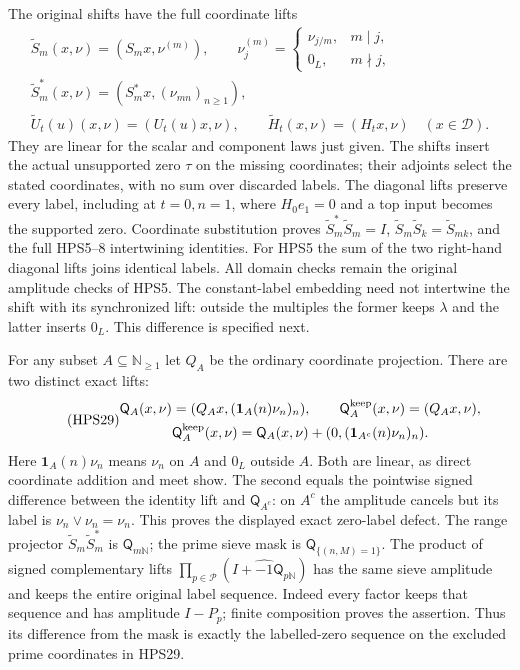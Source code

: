 The original shifts have the full coordinate lifts
\begin{equation}\tag{HPS28}
\begin{gathered}
 \widetilde S_m(x,\nu)=(S_mx,\nu^{(m)}),\qquad
 \nu^{(m)}_j=
    \begin{cases}\nu_{j/m},&m\mid j,\\0_L,&m\nmid j,\end{cases}\\
 \widetilde S_m^*(x,\nu)
                   =(S_m^*x,(\nu_{mn})_{n\ge1}),\\
 \widetilde U_t(u)(x,\nu)=(U_t(u)x,\nu),\qquad
 \widetilde H_t(x,\nu)=(H_tx,\nu)
                         \quad(x\in\mathcal D).
\end{gathered}
\end{equation}
They are linear for the scalar and component
laws just given. The shifts insert the actual
unsupported zero $\tau$ on the missing
coordinates; their adjoints select the stated
coordinates, with no sum over discarded labels.
The diagonal lifts preserve every label,
including at $t=0,n=1$, where $H_0e_1=0$
and a top input becomes the supported zero.
Coordinate substitution proves
$\widetilde S_m^*\widetilde S_m=I$,
$\widetilde S_m\widetilde S_k=\widetilde S_{mk}$,
and the full HPS5--8 intertwining identities.
For HPS5 the sum of the two right-hand
diagonal lifts joins identical labels.
All domain checks remain the original
amplitude checks of HPS5.
The constant-label embedding need not
intertwine the shift with its synchronized
lift: outside the multiples the former
keeps $\lambda$ and the latter inserts
$0_L$. This difference is specified next.

For any subset $A\subseteq\mathbb N_{\ge1}$
let $Q_A$ be the ordinary coordinate projection.
There are two distinct exact lifts:
\begin{equation}\tag{HPS29}
\begin{gathered}
 \mathsf Q_A(x,\nu)=(Q_Ax,(\mathbf1_A(n)\nu_n)_n),\qquad
 \mathsf Q_A^{\rm keep}(x,\nu)=(Q_Ax,\nu),\\
 \mathsf Q_A^{\rm keep}(x,\nu)
     =\mathsf Q_A(x,\nu)
                     +(0,(\mathbf1_{A^c}(n)\nu_n)_n).
\end{gathered}
\end{equation}
Here $\mathbf1_A(n)\nu_n$ means $\nu_n$
on $A$ and $0_L$ outside $A$.
Both are linear, as direct coordinate
addition and meet show. The second equals
the pointwise signed difference between
the identity lift and $\mathsf Q_{A^c}$:
on $A^c$ the amplitude cancels but its
label is $\nu_n\vee\nu_n=\nu_n$.
This proves the displayed exact zero-label
defect. The range projector
$\widetilde S_m\widetilde S_m^*$ is
$\mathsf Q_{m\mathbb N}$; the prime sieve
mask is $\mathsf Q_{\{(n,M)=1\}}$.
The product of signed complementary lifts
$\prod_{p\in\mathcal P}(I+\widehat{-1}
\mathsf Q_{p\mathbb N})$
has the same sieve amplitude and keeps
the entire original label sequence.
Indeed every factor keeps that sequence
and has amplitude $I-P_p$; finite
composition proves the assertion.
Thus its difference from the mask is
exactly the labelled-zero sequence on
the excluded prime coordinates in HPS29.

